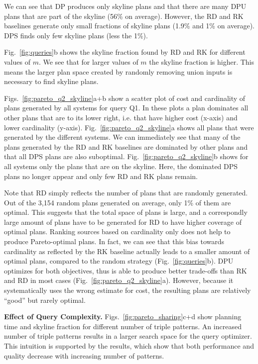 We can see that DP produces only skyline plans and that there are many
DPU plans that are part of the skyline (56\% on average). However, the
RD and RK baselines generate only small fractions of skyline plans (1.9\% and 1\% on
average). DPS finds only few skyline plans (less the 1\%). 

Fig.~\ref{fig:queries}b shows the skyline fraction found by RD and RK for different values of $m$. We see that for larger values of $m$ the skyline fraction is higher. This means the larger plan space created by randomly removing union inputs
is necessary to find skyline plans.

Figs.~\ref{fig:pareto_q2_skyline}a+b show a scatter plot of cost and
cardinality of plans generated by all systems for query Q1. In these
plots a plan dominates all other plans that are to its lower right,
i.e. that have higher cost (x-axis) and lower cardinality
(y-axis). Fig.~\ref{fig:pareto_q2_skyline}a shows all plans that were
generated by the different systems. We can immediately see that many
of the plans generated by the RD and RK baselines are dominated by
other plans and that all DPS plans are also
suboptimal. Fig.~\ref{fig:pareto_q2_skyline}b shows for all systems
only the plans that are on the skyline. Here, the dominated DPS plans
no longer appear and only few RD and RK plans remain.


Note that RD simply reflects the number of plans that are randomly generated. Out of the 3,154 random plans generated on average, only 1\% of them are optimal. This suggests that the total space of plans is large, and a correspondly large amount of plans have to be generated for RD to have higher coverage of optimal plans. 
Ranking sources based on cardinality only does not help to produce Pareto-optimal plans. In fact, we can see that this bias towards cardinality as reflected by the RK baseline actually leads to a smaller amount of optimal plans, compared to the random strategy (Fig.~\ref{fig:queries}b). DPU optimizes for both objectives, thus is able to produce better trade-offs than RK and RD in most cases (Fig.~\ref{fig:pareto_q2_skyline}a). However, because it systematically uses the wrong estimate for cost, the resulting plans are relatively ``good'' but rarely optimal. 


\textbf{Effect of Query Complexity.} Figs.~\ref{fig:pareto_sharing}c+d show 
planning time and skyline fraction for different number of triple patterns. An increased number of triple
patterns results in a larger search space for the query optimizer. This intuition is supported by the results, which show that both performance and quality decrease with increasing number of patterns. 

